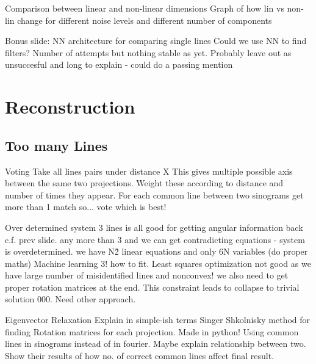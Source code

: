 \documentclass[t, 11pt]{beamer}
\begin{document}
\begin{frame}[fragile]{Comparison between linear and non-linear dimensions}
  Graph of how lin vs non-lin change for different noise levels and different number of components
\end{frame}

\begin{frame}[fragile]{Bonus slide: NN architecture for comparing single lines}
  Could we use NN to find filters? Number of attempts but nothing stable as yet.
  Probably leave out as unsuccesful and long to explain - could do a passing mention
\end{frame}

\section{Reconstruction}
\subsection*{Too many Lines}
\begin{frame}[fragile]{Voting}
  Take all lines pairs under distance X
  This gives multiple possible axis between the same two projections. Weight these according to distance and number of times they appear.
  For each common line between two sinograms get more than 1 match so... vote which is best!
\end{frame}

\begin{frame}[fragile]{Over determined system}
  3 lines is all good for getting angular information back c.f. prev slide.
  any more than 3 and we can get contradicting equations - system is overdetermined. we have N\^2 linear equations and only 6N variables (do proper maths)
  Machine learning 3! how to fit. Least squares optimization not good as we have large number of misidentified lines and nonconvex! we also need to get proper rotation matrices at the end. This constraint leads to collapse to trivial solution 000. Need other approach.
\end{frame}

\begin{frame}[fragile]{Eigenvector Relaxation}
  Explain in simple-ish terms Singer Shkolnisky method for finding Rotation matrices for each projection.
  Made in python! Using common lines in sinograms instead of in fourier. Maybe explain relationship between two. 
  Show their results of how no. of correct common lines affect final result.
\end{frame}
\end{document}
